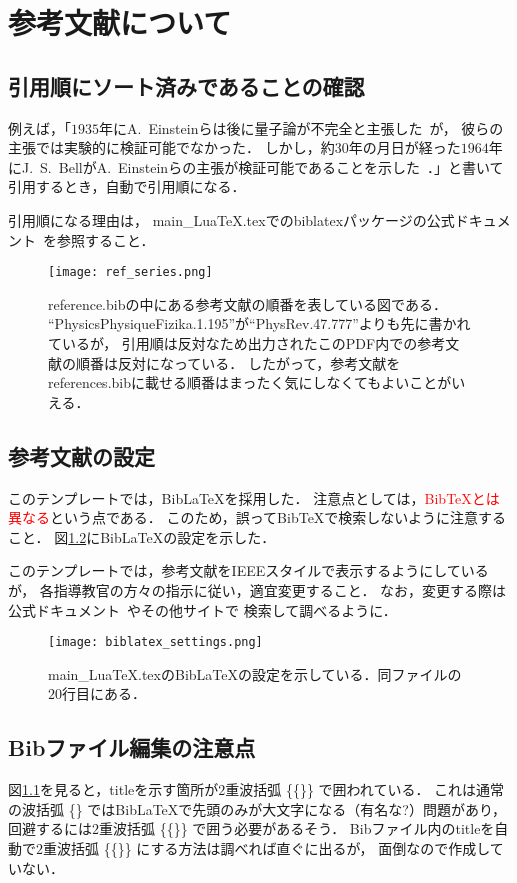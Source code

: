\chapter{参考文献について}
\section{引用順にソート済みであることの確認}
例えば，「$1935$年にA.~Einsteinらは後に量子論が不完全と主張した~\cite{PhysRev.47.777}が，
彼らの主張では実験的に検証可能でなかった．
しかし，約$30$年の月日が経った$1964$年にJ.~S.~BellがA.~Einsteinらの主張が検証可能であることを示した~\cite{PhysicsPhysiqueFizika.1.195}．」と書いて引用するとき，自動で引用順になる．

引用順になる理由は，
main\_LuaTeX.texでのbiblatexパッケージの公式ドキュメント~\cite{biblatex}を参照すること．

\begin{figure}[h]
  \centering
  \texttt{[image: ref\_series.png]}
  \caption{reference.bibの中にある参考文献の順番を表している図である．
  ``PhysicsPhysiqueFizika.1.195''が``PhysRev.47.777''よりも先に書かれているが，
  引用順は反対なため出力されたこのPDF内での参考文献の順番は反対になっている．
  したがって，参考文献をreferences.bibに載せる順番はまったく気にしなくてもよいことがいえる．}
  \label{fig:ref_series}
\end{figure}

\section{参考文献の設定}
このテンプレートでは，Bib\LaTeX を採用した．
注意点としては，\textcolor{red}{Bib\TeX とは異なる}という点である．
このため，誤ってBib\TeX で検索しないように注意すること．
図\ref{fig:biblatex_settings}にBib\LaTeX の設定を示した．

このテンプレートでは，参考文献をIEEEスタイルで表示するようにしているが，
各指導教官の方々の指示に従い，適宜変更すること．
なお，変更する際は公式ドキュメント~\cite{biblatex}やその他サイトで
検索して調べるように．

\begin{figure}[h]
  \centering
  \texttt{[image: biblatex\_settings.png]}
  \caption{main\_LuaTeX.texのBib\LaTeX の設定を示している．同ファイルの$20$行目にある．}
  \label{fig:biblatex_settings}
\end{figure}

\section{Bibファイル編集の注意点}
図\ref{fig:ref_series}を見ると，titleを示す箇所が$2$重波括弧 \{\{\}\} で囲われている．
これは通常の波括弧 \{\} ではBib\LaTeX で先頭のみが大文字になる（有名な?）問題があり，
回避するには$2$重波括弧 \{\{\}\} で囲う必要があるそう．
Bibファイル内のtitleを自動で$2$重波括弧 \{\{\}\} にする方法は調べれば直ぐに出るが，
面倒なので作成していない．
